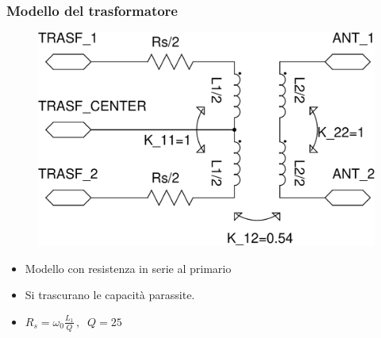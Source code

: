 \documentclass{beamer}
\begin{document}
%
\begin{frame}
\frametitle{Modello del trasformatore}
\begin{figure}
\includegraphics[height=0.4\textheight]{images/trasf_model.pdf}
\end{figure}
\begin{itemize}
	\item Modello con resistenza in serie al primario
	\item Si trascurano le capacit\`a parassite.
	\item $R_s=\omega_0 \frac{L_1}{Q}\, ,\;\; Q=25$
\end{itemize}
\end{frame}
%
\end{document}
